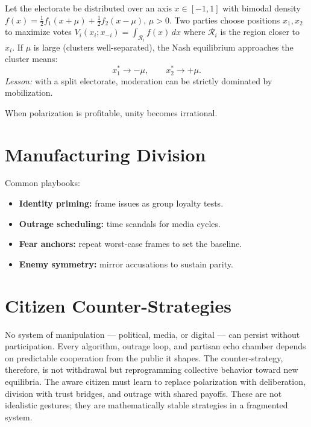 \documentclass[12pt,twoside]{book}
\begin{document}
\begin{tcolorbox}[colback=gray!5,colframe=gray!60,boxrule=0.4pt,arc=1mm,
title={Mathematical Interlude: Bimodal Electorate, Polarized Best Responses}]
Let the electorate be distributed over an axis $x\in[-1,1]$ with bimodal density
$f(x)=\tfrac{1}{2}f_1(x+\mu)+\tfrac{1}{2}f_2(x-\mu)$, $\mu>0$.  
Two parties choose positions $x_1,x_2$ to maximize votes
$V_i(x_i;x_{-i})=\int_{\mathcal{R}_i} f(x)\,dx$ where $\mathcal{R}_i$ is the region closer to $x_i$.  
If $\mu$ is large (clusters well-separated), the Nash equilibrium approaches the cluster means:
\[
x_1^*\to -\mu,\qquad x_2^*\to +\mu.
\]
\textit{Lesson:} with a split electorate, moderation can be strictly dominated by mobilization.
\end{tcolorbox}


\begin{keyidea}
When polarization is profitable, unity becomes irrational.
\end{keyidea}

\section{Manufacturing Division}
Common playbooks:
\begin{itemize}
  \item \textbf{Identity priming:} frame issues as group loyalty tests.
  \item \textbf{Outrage scheduling:} time scandals for media cycles.
  \item \textbf{Fear anchors:} repeat worst-case frames to set the baseline.
  \item \textbf{Enemy symmetry:} mirror accusations to sustain parity.
\end{itemize}

\section{Citizen Counter-Strategies}

No system of manipulation --- political, media, or digital --- can persist without participation.  
Every algorithm, outrage loop, and partisan echo chamber depends on predictable cooperation from the public it shapes.  
The counter-strategy, therefore, is not withdrawal but reprogramming collective behavior toward new equilibria.  
The aware citizen must learn to replace polarization with deliberation, division with trust bridges, and outrage with shared payoffs.  
These are not idealistic gestures; they are mathematically stable strategies in a fragmented system.
\end{document}
